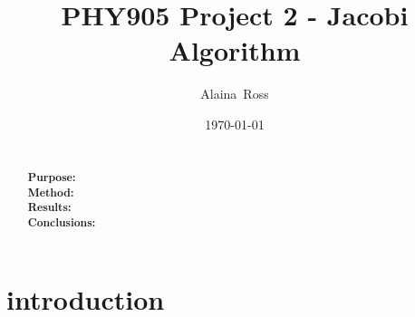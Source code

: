 \documentclass[prc,amsmath,twocolumn,superscriptaddress]{revtex4}
\begin{document}
  \newcommand {\nc} {\newcommand}
  \nc {\Sec} [1] {Sec.~\ref{#1}}
  \nc {\IR} [1] {\textcolor{red}{#1}} 

\title{PHY905 Project 2 - Jacobi Algorithm}


\author{Alaina~Ross}

\date{\today}


\begin{abstract}
\\ {\bf Purpose:} %
\\ {\bf Method:} %
\\ {\bf Results:} %
 \\ {\bf Conclusions:} %
\end{abstract}


\maketitle

\section{introduction}
\label{intro}
\end{document}
